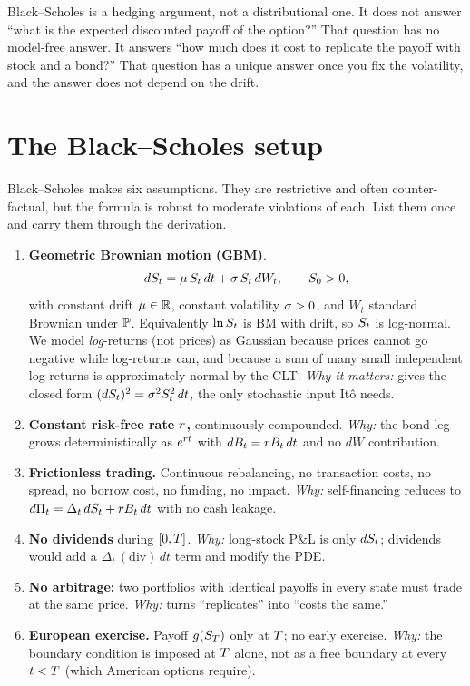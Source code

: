 \begin{intuitionbox}
Black--Scholes is a hedging argument, not a distributional one.
It does not answer ``what is the expected discounted payoff of
the option?'' That question has no model-free answer. It
answers ``how much does it cost to replicate the payoff with
stock and a bond?'' That question has a unique answer once you
fix the volatility, and the answer does not depend on the drift.
\end{intuitionbox}

\section{The Black--Scholes setup}
\label{sec:ch15_setup}

Black--Scholes makes six assumptions. They are restrictive and
often counter-factual, but the formula is robust to moderate
violations of each. List them once and carry them through the
derivation.

\begin{enumerate}
  \item[\textbf{(A1)}] \textbf{Geometric Brownian motion (GBM)}.
  \begin{equation}
    dS_t = \mu\,S_t\,dt + \sigma\,S_t\,dW_t,
    \qquad S_0 > 0,
    \label{eq:gbm}
  \end{equation}
  with constant drift $\mu \in \mathbb{R}$, constant volatility
  $\sigma > 0$, and $W_t$ standard Brownian under $\mathbb{P}$.
  Equivalently $\ln S_t$ is BM with drift, so $S_t$ is
  log-normal. We model \emph{log}-returns (not prices) as
  Gaussian because prices cannot go negative while log-returns
  can, and because a sum of many small independent log-returns
  is approximately normal by the CLT. \emph{Why it matters:}
  gives the closed form $(dS_t)^2 = \sigma^2S_t^2\,dt$,
  the only stochastic input It\^o needs.
  \item[\textbf{(A2)}] \textbf{Constant risk-free rate $r$,}
  continuously compounded. \emph{Why:} the bond leg grows
  deterministically as $e^{r t}$ with $dB_t = r B_t\,dt$
  and no $dW$ contribution.
  \item[\textbf{(A3)}] \textbf{Frictionless trading.} Continuous
  rebalancing, no transaction costs, no spread, no borrow
  cost, no funding, no impact. \emph{Why:} self-financing
  reduces to $d\Pi_t = \Delta_t\,dS_t + r B_t\,dt$ with
  no cash leakage.
  \item[\textbf{(A4)}] \textbf{No dividends} during $[0,T]$.
  \emph{Why:} long-stock P\&L is only $dS_t$; dividends
  would add a $\Delta_t\,(\text{div})\,dt$ term and modify the
  PDE.
  \item[\textbf{(A5)}] \textbf{No arbitrage:} two portfolios
  with identical payoffs in every state must trade at the same
  price. \emph{Why:} turns ``replicates'' into ``costs the
  same.''
  \item[\textbf{(A6)}] \textbf{European exercise.} Payoff
  $g(S_T)$ only at $T$; no early exercise. \emph{Why:}
  the boundary condition is imposed at $T$ alone, not as a
  free boundary at every $t < T$ (which American options
  require).
\end{enumerate}

